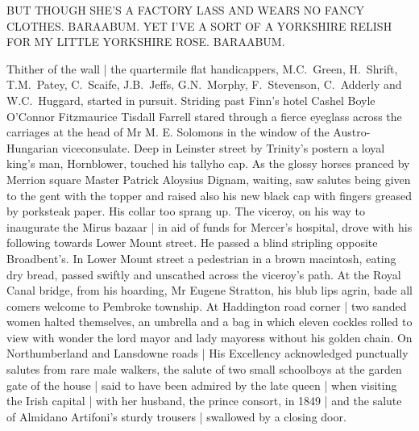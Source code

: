     BUT THOUGH SHE'S A FACTORY LASS
    AND WEARS NO FANCY CLOTHES.
    BARAABUM.
    YET I'VE A SORT OF A
    YORKSHIRE RELISH FOR
    MY LITTLE YORKSHIRE ROSE.
    BARAABUM.


Thither of the wall |
the quartermile flat handicappers,
M.C.~Green,
H.~Shrift,
T.M.~Patey,
C.~Scaife,
J.B.~Jeffs,
G.N.~Morphy,
F.~Stevenson,
C.~Adderly
and W.C.~Huggard,
started in pursuit.
Striding past Finn's
hotel Cashel Boyle O'Connor Fitzmaurice Tisdall Farrell stared through a
fierce eyeglass across the carriages at the head of Mr M. E. Solomons in
the window of the Austro-Hungarian viceconsulate. Deep in Leinster street
by Trinity's postern a loyal king's man, Hornblower, touched his tallyho
cap. As the glossy horses pranced by Merrion square Master Patrick
Aloysius Dignam, waiting, saw salutes being given to the gent with the
topper and raised also his new black cap with fingers greased by
porksteak paper. His collar too sprang up.
The viceroy,
on his way to inaugurate the Mirus bazaar |
in aid of funds for Mercer's hospital,
drove with his following towards Lower Mount street.
He passed a blind stripling opposite Broadbent's.
In Lower Mount street a pedestrian in a brown macintosh,
eating dry bread, passed swiftly and unscathed across the viceroy's path.
At the Royal Canal bridge,
from his hoarding, Mr Eugene Stratton,
his blub lips agrin,
bade all comers welcome to Pembroke township.
At Haddington road corner |
two sanded women halted themselves,
an umbrella and a bag in which eleven cockles rolled to view with wonder
the lord mayor and lady mayoress without his golden chain.
On Northumberland and Lansdowne roads |
His Excellency acknowledged punctually
salutes from rare male walkers,
the salute of two small schoolboys at the garden gate of the house |
said to have been admired by the late queen |
when visiting the Irish capital |
with her husband, the prince consort, in 1849 |
and the salute of Almidano Artifoni's sturdy trousers |
swallowed by a closing door.
